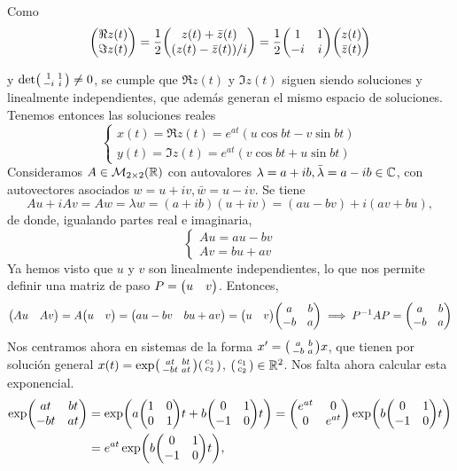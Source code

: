 \documentclass[../ecuaciones_diferenciales.tex]{subfiles}
\begin{document}
Como
\[\mat{\Re z(t) \\ \Im z(t)} = \frac{1}{2} \mat{z(t) + \bar{z}(t) \\
		(z(t) - \bar{z}(t))/i} = \frac{1}{2}\mat{1 & 1 \\ -i & i}\mat{z(t) \\
		\bar{z}(t)} \]

y \(\det\smat{1 & 1 \\ -i & i} \neq 0\), se cumple que \(\Re z(t)\) y
\(\Im z(t)\) siguen siendo soluciones y linealmente independientes, que además
generan el mismo espacio de soluciones. Tenemos entonces las soluciones reales
\[
	\begin{cases}
		x(t) = \Re z(t) = e^{at}(u\cos bt - v\sin bt) \\
		y(t) = \Im z(t) = e^{at}(v\cos bt + u\sin bt)
	\end{cases}
\]
Consideramos \(A \in \mathcal{M}_{2 \times 2}(\mathbb{R})\) con autovalores
\(\lambda = a+ib, \bar{\lambda} = a-ib \in \mathbb{C}\), con autovectores
asociados \(w = u+iv, \bar{w} = u-iv\). Se tiene
\[Au + iAv = Aw = \lambda w = (a+ib)(u+iv) = (au-bv) + i(av+bu),\]
de donde, igualando partes real e imaginaria,
\[
	\begin{cases}
		Au = au-bv \\
		Av = bu+av
	\end{cases}
\]
Ya hemos visto que \(u\) y \(v\) son linealmente independientes, lo que nos
permite definir una matriz de paso \(P = \begin{pmatrix}u & v\end{pmatrix}\). Entonces,
\[\mat{Au & Av} = A \mat{u & v} = \mat{au-bv & bu+av} = \mat{u & v} \mat{a & b
		\\ -b & a} \implies P^{-1}AP = \mat{a & b \\ -b & a}\]
Nos centramos ahora en sistemas de la forma \(x' = \smat{a & b \\ -b & a}x\),
que tienen por solución general \(x(t) = \exp \smat{at & bt \\ -bt & at}
\smat{c_1 \\ c_2}\), \(\smat{c_1 \\ c_2} \in \R^2\). Nos falta ahora calcular
esta exponencial.
\begin{align*}
	\exp\mat{at & bt                            \\ -bt & at} &= \exp\left(a\mat{1 & 0 \\ 0 & 1}t + b\mat{0 & 1 \\
	-1          & 0}t\right) = \mat{e^{at}  & 0 \\ 0 & e^{at}} \exp\left(b\mat{0 & 1
	\\ -1 & 0}t\right) \\
	            & = e^{at}\exp\left(b\mat{0 & 1 \\ -1 & 0}t\right),
\end{align*}
\end{document}
